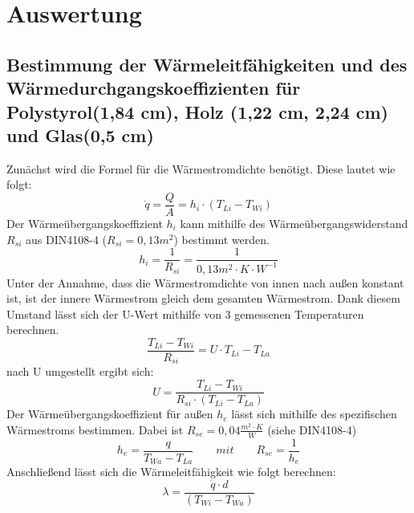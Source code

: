 \section{Auswertung}
\subsection{Bestimmung der Wärmeleitfähigkeiten und des Wärmedurchgangskoeffizienten für Polystyrol(1,84 cm), Holz (1,22 cm,  2,24 cm) und Glas(0,5 cm)}
Zunächst wird die Formel für die Wärmestromdichte benötigt. Diese lautet wie folgt:
\begin{equation}
\dot q=\frac{ Q }{ A }=h_{ i }\cdot(T_{ Li }-T_{Wi})
  \label{eq:230514_Wärmestromdichte}
\end{equation}
Der Wärmeübergangskoeffizient $h_{i}$ kann mithilfe des Wärmeübergangswiderstand $R_{si}$ aus DIN4108-4 ($R_{si}=0,13 m^2$) bestimmt werden.
\begin{equation}
h_{i}=\frac{ 1 }{ R_{ si } }=\frac{ 1 }{ 0,13m^2\cdot K \cdot W^{-1} }
  \label{eq:230514_Wärmeübergangskoeffizient}
\end{equation}
Unter der Annahme, dass die Wärmestromdichte von innen nach außen konstant ist, ist der innere Wärmestrom gleich dem gesamten Wärmestrom. Dank diesem Umstand lässt sich der U-Wert mithilfe von 3 gemessenen Temperaturen berechnen.
\begin{equation}
\frac{ T_{Li} - T_{Wi}}{ R_{ si } }=U \cdot T_{Li} - T_{La}
  \label{eq:230514_u1}
\end{equation}
nach U umgestellt ergibt sich: 
\begin{equation}
U = \frac{ T_{Li} - T_{Wi}}{ R_{ si } \cdot  (T_{Li} - T_{La})}
  \label{eq:230514_u2}
\end{equation}
Der Wärmeübergangskoeffizient für außen $h_{e}$ lässt sich mithilfe des spezifischen Wärmestroms bestimmen. Dabei ist $R_{se}=0,04 \frac{ m^2 \cdot K }{W}$ (siehe DIN4108-4)
\begin{equation}
h_{e}=\frac{ q }{ T_{Wa} - T_{La} }   \qquad  mit     \qquad       R_{se}=\frac{ 1 }{ h_{e} }
  \label{eq:230514_h_e}
\end{equation}
Anschließend lässt sich die Wärmeleitfähigkeit wie folgt berechnen:
\begin{equation}
\lambda=\frac{ \dot q \cdot d }{  ( T_{Wi} - T_{Wa} )}
  \label{eq:230514_lamda}
\end{equation}

